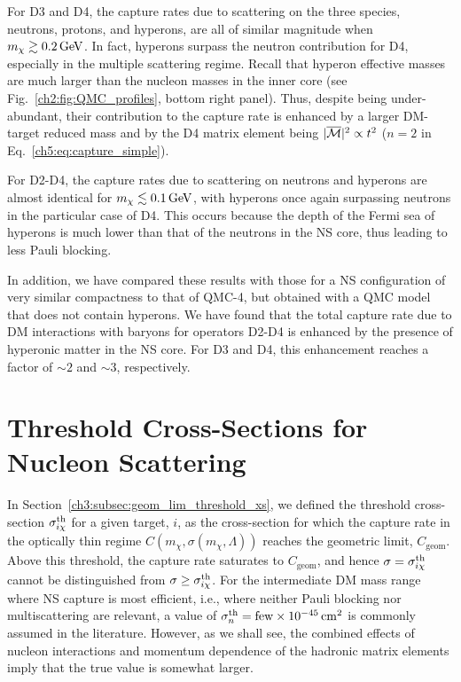 For D3 and D4, the capture rates due to scattering on the three species, neutrons, protons, and hyperons, are all of similar magnitude when $m_\chi\gtrsim0.2{\rm \,GeV}$. In fact, hyperons surpass the neutron contribution for D4, especially in the multiple scattering regime.  Recall that hyperon effective masses are much larger than the nucleon masses in the inner core (see Fig.~\ref{ch2:fig:QMC_profiles}, bottom right panel). Thus, despite being under-abundant, their contribution to the capture rate is enhanced by a larger DM-target reduced mass and by the D4 matrix element being $|\overline{\mathcal M}|^2\propto t^2$ ($n=2$ in  Eq.~\ref{ch5:eq:capture_simple}). 

For D2-D4, the capture rates due to scattering on neutrons and hyperons are almost identical for $m_\chi\lesssim0.1{\rm \,GeV}$, with hyperons once again surpassing neutrons in the particular case of D4.  This occurs because the depth of the Fermi sea of hyperons is much lower than that of the neutrons in the NS core, thus leading to less Pauli blocking. 

In addition, we have compared these results with those for a NS configuration of very similar compactness to that of QMC-4, but obtained with a QMC model that does not contain hyperons. We have found that the total capture rate due to DM interactions with baryons for operators D2-D4 is enhanced by the presence of hyperonic matter in the NS core. For D3 and D4, this enhancement reaches a factor of $\sim 2$ and $\sim 3$, respectively.


\section{Threshold Cross-Sections for Nucleon Scattering}
\label{ch5:sec:sigmath_results}



In Section~\ref{ch3:subsec:geom_lim_threshold_xs}, we defined the threshold cross-section $\sigma^{\rm th}_{i\chi}$ for a given target, $i$, as the cross-section for which the capture rate in the optically thin regime $C(m_\chi,\sigma(m_\chi,\Lambda))$ reaches the geometric limit, $C_\mathrm{geom}$. Above this threshold, the capture rate saturates to $C_\mathrm{geom}$, and hence $\sigma = \sigma^{\rm th}_{i\chi}$ cannot be distinguished from $\sigma\ge\sigma^{\rm th}_{i\chi}$. For the intermediate DM mass range where NS capture is most efficient, i.e., where neither Pauli blocking nor multiscattering are relevant, a value of $\sigma^\mathrm{th}_n = \textrm{few}\times10^{-45}{\rm \,cm}^2$ is commonly assumed in the literature.  However, as we shall see, the combined effects of nucleon interactions and momentum dependence of the hadronic matrix elements imply that the true value is somewhat larger. 


